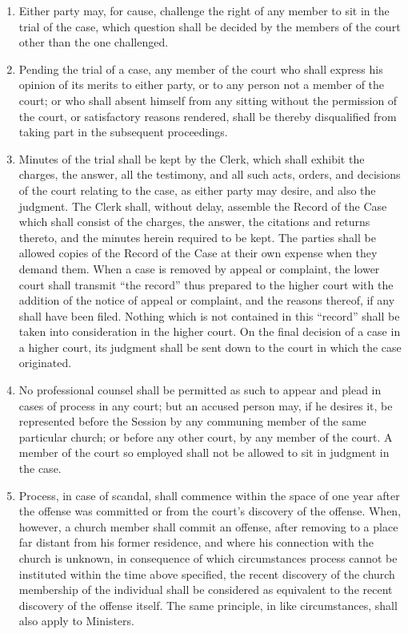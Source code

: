 \documentclass[
]{book}
\begin{document}
\begin{enumerate}
\item
  Either party may, for cause, challenge the right of any member to sit in the trial of the case, which question shall be decided by the members of the court other than the one challenged.
\item
  Pending the trial of a case, any member of the court who shall express his opinion of its merits to either party, or to any person not a member of the court; or who shall absent himself from any sitting without the permission of the court, or satisfactory reasons rendered, shall be thereby disqualified from taking part in the subsequent proceedings.
\item
  Minutes of the trial shall be kept by the Clerk, which shall exhibit the charges, the answer, all the testimony, and all such acts, orders, and decisions of the court relating to the case, as either party may desire, and also the judgment. The Clerk shall, without delay, assemble the Record of the Case which shall consist of the charges, the answer, the citations and returns thereto, and the minutes herein required to be kept. The parties shall be allowed copies of the Record of the Case at their own expense when they demand them. When a case is removed by appeal or complaint, the lower court shall transmit ``the record'' thus prepared to the higher court with the addition of the notice of appeal or complaint, and the reasons thereof, if any shall have been filed. Nothing which is not contained in this ``record'' shall be taken into consideration in the higher court. On the final decision of a case in a higher court, its judgment shall be sent down to the court in which the case originated.
\item
  No professional counsel shall be permitted as such to appear and plead in cases of process in any court; but an accused person may, if he desires it, be represented before the Session by any communing member of the same particular church; or before any other court, by any member of the court. A member of the court so employed shall not be allowed to sit in judgment in the case.
\item
  Process, in case of scandal, shall commence within the space of one year after the offense was committed or from the court's discovery of the offense. When, however, a church member shall commit an offense, after removing to a place far distant from his former residence, and where his connection with the church is unknown, in consequence of which circumstances process cannot be instituted within the time above specified, the recent discovery of the church membership of the individual shall be considered as equivalent to the recent discovery of the offense itself. The same principle, in like circumstances, shall also apply to Ministers.
\end{enumerate}
\end{document}
